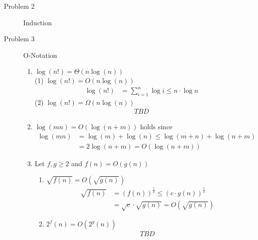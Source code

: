 \documentclass[11pt,a4paper,ngerman]{article}
\begin{document}
\begin{description}
\item[Problem 2] Induction \\


\item[Problem 3] O-Notation
  \begin{enumerate}
    \item $\log(n!) = \Theta(n \log(n))$\\
          (1) $\log(n!) = O(n \log(n))$ \\
              \begin{equation}\begin{split}
                \log(n!) &= \sum_{i=1}^n {\log i} 
                         \leq n \cdot \log n
              \end{split}\end{equation}
          (2) $\log(n!) = \Omega(n \log(n))$ \\
              \begin{equation}\begin{split}
                TBD
              \end{split}\end{equation}
    \item $\log(mn) = O(\log(n+m))$ holds since
      \begin{equation}\begin{split}
        \log(mn) &= \log(m) + \log(n) \leq \log(m+n) + \log(n+m)\\
                 &= 2 \log(n+m) = O(\log(n+m))
      \end{split}\end{equation}
  
    \item Let $f,g \geq 2$ and $f(n) = O(g(n))$
    \begin{enumerate}
      \item $\sqrt{f(n)} = O(\sqrt{g(n)})$
            \begin{equation}\begin{split}
              \sqrt{f(n)} &= (f(n))^{\frac{1}{2}} \leq (c\cdot g(n))^{\frac{1}{2}}\\
                          &= \sqrt{c}\cdot \sqrt{g(n)} = O(\sqrt{g(n)})
            \end{split}\end{equation}
      \item $2^f(n) = O(2^g(n))$
            \begin{equation}\begin{split}
              TBD
            \end{split}\end{equation}
    \end{enumerate}
  \end{enumerate}

\end{description}

\label{LastPage}
\end{document}
